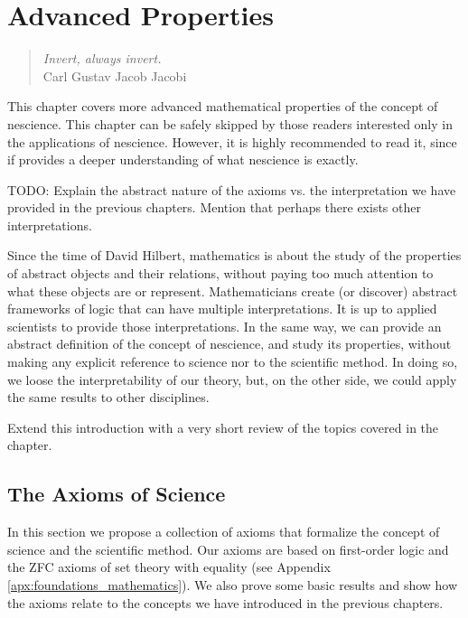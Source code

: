 %
%


\chapter{Advanced Properties}
\label{chap:Properties-Nescience}

\begin{quote}
\begin{flushright}
\emph{Invert, always invert.}\\
Carl Gustav Jacob Jacobi\\
\end{flushright}
\end{quote}
\bigskip

This chapter covers more advanced mathematical properties of the concept of nescience. This chapter can be safely skipped by those readers interested only in the applications of nescience. However, it is highly recommended to read it, since if provides a deeper understanding of what nescience is exactly.

{\color{red} TODO: Explain the abstract nature of the axioms vs. the interpretation we have provided in the previous chapters. Mention that perhaps there exists other interpretations.}

Since the time of David Hilbert, mathematics is about the study of the properties of abstract objects and their relations, without paying too much attention to what these objects are or represent. Mathematicians create (or discover) abstract frameworks of logic that can have multiple interpretations. It is up to applied scientists to provide those interpretations. In the same way, we can provide an abstract definition of the concept of nescience, and study its properties, without making any explicit reference to science nor to the scientific method. In doing so, we loose the interpretability of our theory, but, on the other side, we could apply the same results to other disciplines.

{\color{red} Extend this introduction with a very short review of the topics covered in the chapter.}

%
%

\section{The Axioms of Science}

In this section we propose a collection of axioms that formalize the concept of science and the scientific method. Our axioms are based on first-order logic and the ZFC axioms of set theory with equality (see Appendix \ref{apx:foundations_mathematics}). We also prove some basic results and show how the axioms relate to the concepts we have introduced in the previous chapters.

